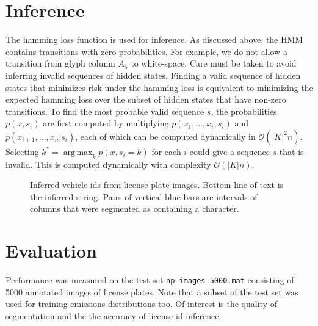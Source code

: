 \documentclass[a4paper,12pt]{article}
\DeclareMathOperator*{\argmax}{arg\,max}
\begin{document}
\section{Inference}
The hamming loss function is used for inference. As discussed above,
the HMM contains transitions with zero probabilities. For example, we
do not allow a transition from glyph column $A_5$ to white-space.
Care must be taken to avoid inferring invalid sequences of hidden
states.  Finding a valid sequence of hidden states that minimizes risk
under the hamming loss is equivalent to minimizing the expected
hamming loss over the subset of hidden states that have non-zero
transitions.  
To find the most probable valid sequence $s$, the probabilities
$p(x,s_i)$ are first computed by multiplying $p(x_1,\ldots,x_i,s_i)$
and $p(x_{i+1},\ldots,x_n|s_i)$, each of which can be computed
dynamically in $\mathcal{O}(|K|^2n)$. Selecting
$k^*=\argmax_k{p(x,s_i=k)}$ for each $i$ could give a sequence $s$
that is invalid.  This is computed dynamically with complexity
$\mathcal{O}(|K|n)$.

\begin{figure}[h]
  \centering
  \caption{Inferred vehicle ids from license plate images. Bottom
    line of text is the inferred string. Pairs of vertical blue bars
    are intervals of columns that were segmented as containing a
    character.}
  \label{fig:inferred-strings}
\end{figure}

\section{Evaluation}
Performance was measured on the test set \texttt{np-images-5000.mat}
consisting of 5000 annotated images of license plates.  Note that a
subset of the test set was used for training emissions distributions
too. Of interest is the quality of segmentation and the the accuracy of
license-id inference.
\end{document}
